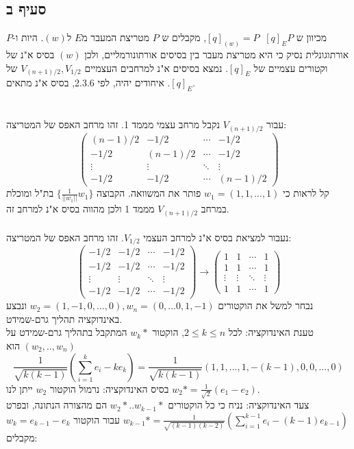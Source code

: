 \documentclass{article}
\DeclareMathOperator{\tra}{^t}
\begin{document}
\subsection*{סעיף ב}
מכיוון ש $[q]_(w)=P\tra [q]_E P$, מקבלים ש $P$ מטריצת המעבר מ$E$ ל$(w)$. היות ו-$P$ אורתוגונלית נסיק כי היא מטריצת מעבר בין בסיסים אורתונורמליים, ולכן $(w)$ בסיס א"נ של וקטורים עצמיים של $[q]_E$.
נמצא בסיסים א"נ למרחבים העצמיים $V_{(n+1)/2}, V_{1/2}$ של $[q]_E$. איחודים יהיה, לפי 2.3.6, בסיס א"נ מתאים.\\
\\\\
עבור $V_{(n+1)/2}$ נקבל מרחב עצמי מממד 1. זהו מרחב האפס של המטריצה:
\[
    \begin{pmatrix}
        (n-1)/2 & -1/2    & \cdots & -1/2    \\
        -1/2    & (n-1)/2 & \cdots & -1/2    \\
        \vdots  & \vdots  & \ddots & \vdots  \\
        -1/2    & -1/2    & \cdots & (n-1)/2
    \end{pmatrix}
\]
קל לראות כי $w_1=(1,1,...,1)$ פותר את המשוואה. הקבוצה $\{ \frac{1}{||w_1||}w_1 \}$ בת"ל ומוכלת במרחב $V_{(n+1)/2}$ מממד 1 ולכן מהווה בסיס א"נ למרחב זה.
\\\\
נעבור למציאת בסיס א"נ למרחב העצמי $V_{1/2}$. זהו מרחב האפס של המטריצה:
\[
    \begin{pmatrix}
        -1/2   & -1/2   & \cdots & -1/2   \\
        -1/2   & -1/2   & \cdots & -1/2   \\
        \vdots & \vdots & \ddots & \vdots \\
        -1/2   & -1/2   & \cdots & -1/2
    \end{pmatrix}\rightarrow
    \begin{pmatrix}
        1      & 1      & \cdots & 1      \\
        1      & 1      & \cdots & 1      \\
        \vdots & \vdots & \ddots & \vdots \\
        1      & 1      & \cdots & 1
    \end{pmatrix}
\]
נבחר למשל את הוקטורים $w_2=(1,-1,0,...,0), w_n=(0,...0, 1, -1)$ ונבצע באינדוקציה תהליך גרם-שמידט.\\
טענת האינדוקציה: לכל $2\leq k\leq n$, הוקטור $w_k*$ המתקבל בתהליך גרם-שמידט על $(w_2,..,w_n)$ הוא
\[
    \frac{1}{\sqrt{k(k-1)}}(\sum_{i=1}^{k}e_i-ke_k)=\frac{1}{\sqrt{k(k-1)}}(1,1,...,1,-(k-1),0,0,...,0)
\]
בסיס האינדוקציה: נרמול הוקטור $w_2$ ייתן לנו $w_2*=\frac{1}{\sqrt{2}}(e_1-e_2)$. \\
צעד האינדוקציה: נניח כי כל הוקטורים $w_2*..w_{k-1}*$ הם מהצורה הנתונה, ובפרט $w_{k-1}*=\frac{1}{\sqrt{(k-1)(k-2)}}(\sum_{i=1}^{k-1}e_i-(k-1)e_{k-1})$
עבור הוקטור $w_k=e_{k-1}-e_{k}$ מקבלים:
\end{document}
